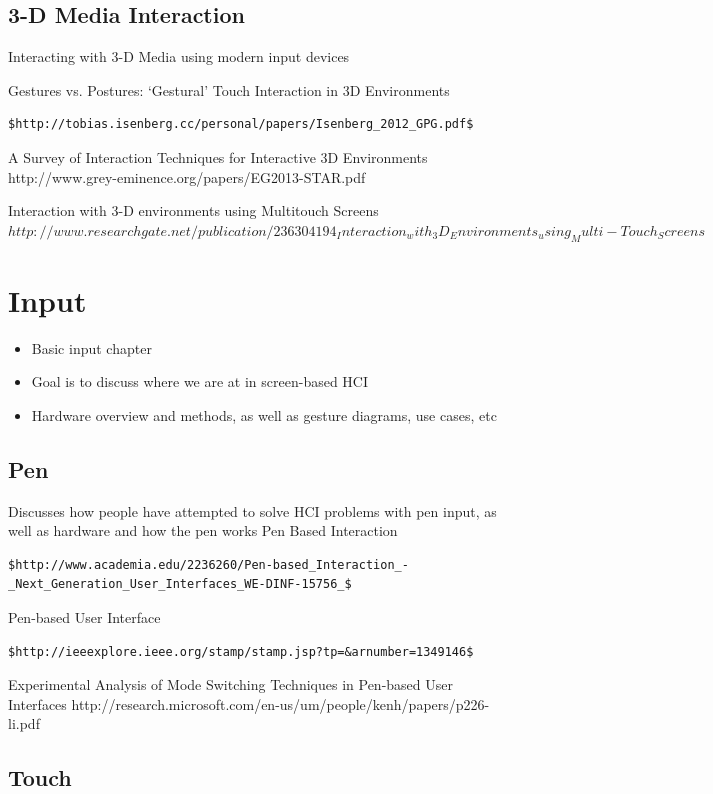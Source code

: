 \documentclass[12pt]{report}
\begin{document}
\pagebreak

\section{3-D Media Interaction}

Interacting with 3-D Media using modern input devices

Gestures vs. Postures: ‘Gestural’ Touch Interaction in 3D Environments 

\begin{verbatim}
$http://tobias.isenberg.cc/personal/papers/Isenberg_2012_GPG.pdf$
\end{verbatim}
A Survey of Interaction Techniques for Interactive 3D Environments http://www.grey-eminence.org/papers/EG2013-STAR.pdf

Interaction with 3-D environments using Multitouch Screens $http://www.researchgate.net/publication/236304194_Interaction_with_3D_Environments_using_Multi-Touch_Screens$

\pagebreak
\chapter{Input}

\begin{itemize}
\item Basic input chapter
\item Goal is to discuss where we are at in screen-based HCI
\item Hardware overview and methods, as well as gesture diagrams, use cases, etc
\end{itemize}
\section{Pen}

Discusses how people have attempted to solve HCI problems with pen input, as well as hardware and how the pen works 
Pen Based Interaction 
\begin{verbatim}
$http://www.academia.edu/2236260/Pen-based_Interaction_-_Next_Generation_User_Interfaces_WE-DINF-15756_$
\end{verbatim}
Pen-based User Interface 
\begin{verbatim}
$http://ieeexplore.ieee.org/stamp/stamp.jsp?tp=&arnumber=1349146$
\end{verbatim}
Experimental Analysis of Mode Switching Techniques in Pen-based User Interfaces http://research.microsoft.com/en-us/um/people/kenh/papers/p226-li.pdf
\section{Touch}
\end{document}

